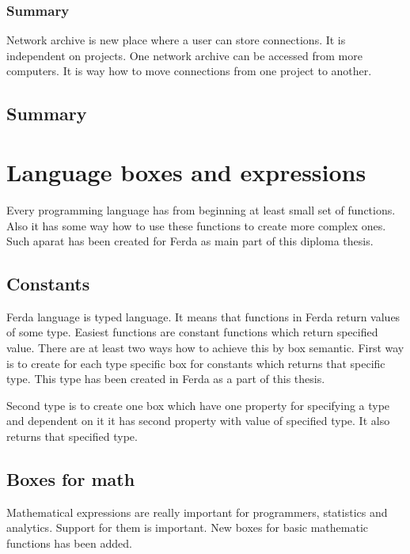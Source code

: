 \documentclass[a4paper,12pt]{book}
\begin{document}
\subsubsection{Summary}
Network archive is new place where a user can store connections. It is independent on projects. One network archive can be accessed from more computers. It is way how to move connections from one project to another.

\subsection{Summary}

\section{Language boxes and expressions}
Every programming language has from beginning at least small set of functions. Also it has some way how to use these functions to create more complex ones. Such aparat has been created for Ferda as main part of this diploma thesis.

\subsection{Constants}
Ferda language is typed language. It means that functions in Ferda return values of some type. Easiest functions are constant functions which return specified value. There are at least two ways how to achieve this by box semantic. First way is to create for each type specific box for constants which returns that specific type. This type has been created in Ferda as a part of this thesis.

Second type is to create one box which have one property for specifying a type and dependent on it it has second property with value of specified type. It also returns that specified type.

\subsection{Boxes for math}
Mathematical expressions are really important for programmers, statistics and analytics. Support for them is important. New boxes for basic mathematic functions has been added. 
\end{document}
